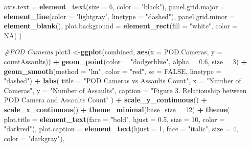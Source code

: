 \documentclass[
]{article}
\newenvironment{Shaded}{\begin{snugshade}}{\end{snugshade}}
\newcommand{\AttributeTok}[1]{\textcolor[rgb]{0.13,0.29,0.53}{#1}}
\newcommand{\CommentTok}[1]{\textcolor[rgb]{0.56,0.35,0.01}{\textit{#1}}}
\newcommand{\ConstantTok}[1]{\textcolor[rgb]{0.56,0.35,0.01}{#1}}
\newcommand{\DecValTok}[1]{\textcolor[rgb]{0.00,0.00,0.81}{#1}}
\newcommand{\FloatTok}[1]{\textcolor[rgb]{0.00,0.00,0.81}{#1}}
\newcommand{\FunctionTok}[1]{\textcolor[rgb]{0.13,0.29,0.53}{\textbf{#1}}}
\newcommand{\NormalTok}[1]{#1}
\newcommand{\OtherTok}[1]{\textcolor[rgb]{0.56,0.35,0.01}{#1}}
\newcommand{\SpecialCharTok}[1]{\textcolor[rgb]{0.81,0.36,0.00}{\textbf{#1}}}
\newcommand{\StringTok}[1]{\textcolor[rgb]{0.31,0.60,0.02}{#1}}
\begin{document}
\begin{Shaded}
\begin{Highlighting}[]
    \AttributeTok{axis.text =} \FunctionTok{element\_text}\NormalTok{(}\AttributeTok{size =} \DecValTok{6}\NormalTok{, }\AttributeTok{color =} \StringTok{"black"}\NormalTok{),}
    \AttributeTok{panel.grid.major =} \FunctionTok{element\_line}\NormalTok{(}\AttributeTok{color =} \StringTok{"lightgray"}\NormalTok{, }\AttributeTok{linetype =} \StringTok{"dashed"}\NormalTok{),}
    \AttributeTok{panel.grid.minor =} \FunctionTok{element\_blank}\NormalTok{(),}
    \AttributeTok{plot.background =} \FunctionTok{element\_rect}\NormalTok{(}\AttributeTok{fill =} \StringTok{"white"}\NormalTok{, }\AttributeTok{color =} \ConstantTok{NA}\NormalTok{)}
\NormalTok{  )}

\CommentTok{\#POD Cameras}
\NormalTok{plot3 }\OtherTok{\textless{}{-}}\FunctionTok{ggplot}\NormalTok{(combined, }\FunctionTok{aes}\NormalTok{(}\AttributeTok{x =} \StringTok{\textasciigrave{}}\AttributeTok{POD.Cameras}\StringTok{\textasciigrave{}}\NormalTok{, }\AttributeTok{y =} \StringTok{\textasciigrave{}}\AttributeTok{countAssaults}\StringTok{\textasciigrave{}}\NormalTok{)) }\SpecialCharTok{+} 
  \FunctionTok{geom\_point}\NormalTok{(}\AttributeTok{color =} \StringTok{"dodgerblue"}\NormalTok{, }\AttributeTok{alpha =} \FloatTok{0.6}\NormalTok{, }\AttributeTok{size =} \DecValTok{3}\NormalTok{) }\SpecialCharTok{+}
  \FunctionTok{geom\_smooth}\NormalTok{(}\AttributeTok{method =} \StringTok{"lm"}\NormalTok{, }\AttributeTok{color =} \StringTok{"red"}\NormalTok{, }\AttributeTok{se =} \ConstantTok{FALSE}\NormalTok{, }\AttributeTok{linetype =} \StringTok{"dashed"}\NormalTok{) }\SpecialCharTok{+}
  \FunctionTok{labs}\NormalTok{(}
    \AttributeTok{title =} \StringTok{"POD Cameras vs Assaults Count"}\NormalTok{,  }
    \AttributeTok{x =} \StringTok{"Number of Cameras"}\NormalTok{,}
    \AttributeTok{y =} \StringTok{"Number of Assaults"}\NormalTok{,}
    \AttributeTok{caption =} \StringTok{"Figure 3. Relationship between POD Camera and Assaults Count"}
\NormalTok{  ) }\SpecialCharTok{+} 
  \FunctionTok{scale\_y\_continuous}\NormalTok{() }\SpecialCharTok{+}
  \FunctionTok{scale\_x\_continuous}\NormalTok{() }\SpecialCharTok{+} 
  \FunctionTok{theme\_minimal}\NormalTok{(}\AttributeTok{base\_size =} \DecValTok{12}\NormalTok{) }\SpecialCharTok{+}
  \FunctionTok{theme}\NormalTok{(}
    \AttributeTok{plot.title =} \FunctionTok{element\_text}\NormalTok{(}\AttributeTok{face =} \StringTok{"bold"}\NormalTok{, }\AttributeTok{hjust =} \FloatTok{0.5}\NormalTok{, }\AttributeTok{size =} \DecValTok{10}\NormalTok{, }\AttributeTok{color =} \StringTok{"darkred"}\NormalTok{),}
    \AttributeTok{plot.caption =} \FunctionTok{element\_text}\NormalTok{(}\AttributeTok{hjust =} \DecValTok{1}\NormalTok{, }\AttributeTok{face =} \StringTok{"italic"}\NormalTok{, }\AttributeTok{size =} \DecValTok{4}\NormalTok{, }\AttributeTok{color =} \StringTok{"darkgray"}\NormalTok{),}

\end{Highlighting}
\end{Shaded}
\end{document}

